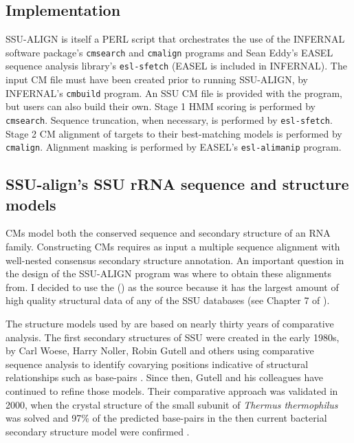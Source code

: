 \subsection{Implementation}

SSU-ALIGN is itself a PERL script that orchestrates the
use of the INFERNAL software package's \texttt{cmsearch} and
\texttt{cmalign} programs \cite{infernal} and Sean Eddy's EASEL
sequence analysis library's \texttt{esl-sfetch} (EASEL is
included in INFERNAL).  The input CM file must have been created
prior to running SSU-ALIGN, by INFERNAL's \texttt{cmbuild}
program. An SSU CM file is provided with the program, but users can
also build their own. Stage 1 HMM scoring is performed by
\texttt{cmsearch}. Sequence truncation, when necessary, is performed
by \texttt{esl-sfetch}. Stage 2 CM alignment of targets to their
best-matching models is performed by \texttt{cmalign}. Alignment
masking is performed by EASEL's \texttt{esl-alimanip} program. 

\subsection{SSU-align's SSU rRNA sequence and structure models}

CMs model both the conserved sequence and secondary structure of an
RNA family. Constructing CMs requires as input a multiple sequence
alignment with well-nested consensus secondary structure
annotation. An important question in the design of the SSU-ALIGN
program was where to obtain these alignments from. I decided to use
the  () \cite{CannoneGutell02} as
the source because it has the largest amount of high quality
structural data of any of the SSU databases (see
Chapter 7 of \cite{Nawrocki09b}).

The structure models used by  are based on nearly thirty years of
comparative analysis. The first secondary structures of SSU were
created in the early 1980s, by Carl Woese, Harry Noller, Robin Gutell
and others using comparative sequence analysis to identify covarying
positions indicative of structural relationships such as base-pairs
\cite{Woese80,Noller81,Woese83}. Since then, Gutell and his
colleagues have continued to refine those models. Their comparative
approach was validated in 2000, when the crystal structure of the
small subunit of \emph{Thermus thermophilus} was solved
\cite{Wimberly00} and 97\% of the predicted base-pairs in the then
current bacterial secondary structure model were confirmed
\cite{Gutell02}.

